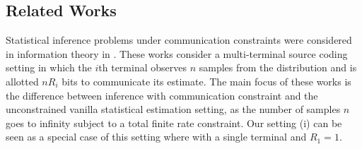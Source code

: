 \documentclass[letterpaper, conference]{IEEEtran}      %
\begin{document}
%


\subsection*{Related Works}
Statistical inference problems under communication constraints were considered in information theory in 
\cite{han1987hypothesis, zhang1988estimation, 720540}. These works consider a multi-terminal source coding setting in which the $i$th terminal observes $n$ samples from the distribution and is allotted $nR_i$ bits to communicate its estimate. The main focus of these works is the difference between inference with communication constraint and the unconstrained vanilla statistical estimation setting, as the number of samples $n$ goes to infinity subject to a total finite rate constraint. Our setting (i) can be seen as a special case of this setting where with a single terminal and $R_1 = 1$.%
\end{document}
